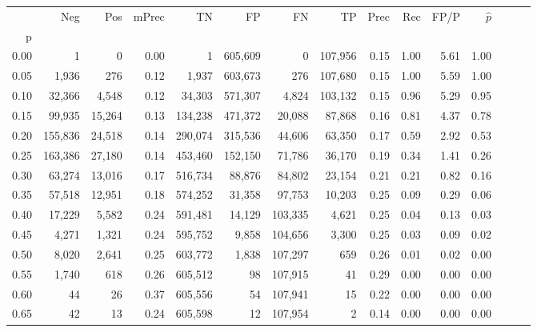 \begin{tabular}{rrrrrrrrrrrrrrr}
\toprule
{} &      Neg &     Pos & mPrec &       TN &       FP &       FN &       TP &  Prec &   Rec &  FP/P & $\hat{p}$ \\
p    &          &         &       &          &          &          &          &       &       &       &           \\
\midrule
0.00 &        1 &       0 &  0.00 &        1 &  605,609 &        0 &  107,956 &  0.15 &  1.00 &  5.61 &      1.00 \\
0.05 &    1,936 &     276 &  0.12 &    1,937 &  603,673 &      276 &  107,680 &  0.15 &  1.00 &  5.59 &      1.00 \\
0.10 &   32,366 &   4,548 &  0.12 &   34,303 &  571,307 &    4,824 &  103,132 &  0.15 &  0.96 &  5.29 &      0.95 \\
0.15 &   99,935 &  15,264 &  0.13 &  134,238 &  471,372 &   20,088 &   87,868 &  0.16 &  0.81 &  4.37 &      0.78 \\
0.20 &  155,836 &  24,518 &  0.14 &  290,074 &  315,536 &   44,606 &   63,350 &  0.17 &  0.59 &  2.92 &      0.53 \\
0.25 &  163,386 &  27,180 &  0.14 &  453,460 &  152,150 &   71,786 &   36,170 &  0.19 &  0.34 &  1.41 &      0.26 \\
0.30 &   63,274 &  13,016 &  0.17 &  516,734 &   88,876 &   84,802 &   23,154 &  0.21 &  0.21 &  0.82 &      0.16 \\
0.35 &   57,518 &  12,951 &  0.18 &  574,252 &   31,358 &   97,753 &   10,203 &  0.25 &  0.09 &  0.29 &      0.06 \\
0.40 &   17,229 &   5,582 &  0.24 &  591,481 &   14,129 &  103,335 &    4,621 &  0.25 &  0.04 &  0.13 &      0.03 \\
0.45 &    4,271 &   1,321 &  0.24 &  595,752 &    9,858 &  104,656 &    3,300 &  0.25 &  0.03 &  0.09 &      0.02 \\
0.50 &    8,020 &   2,641 &  0.25 &  603,772 &    1,838 &  107,297 &      659 &  0.26 &  0.01 &  0.02 &      0.00 \\
0.55 &    1,740 &     618 &  0.26 &  605,512 &       98 &  107,915 &       41 &  0.29 &  0.00 &  0.00 &      0.00 \\
0.60 &       44 &      26 &  0.37 &  605,556 &       54 &  107,941 &       15 &  0.22 &  0.00 &  0.00 &      0.00 \\
0.65 &       42 &      13 &  0.24 &  605,598 &       12 &  107,954 &        2 &  0.14 &  0.00 &  0.00 &      0.00 \\

\end{tabular}
